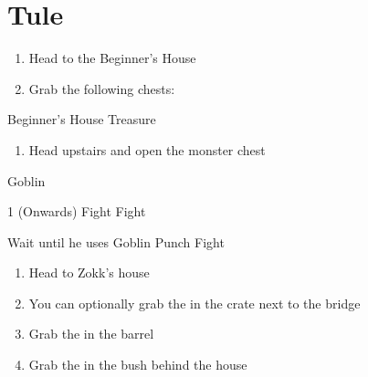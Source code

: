 \chapter{Tule}

\vspace{\baselineskip}

\begin{paracol}{2}

\begin{enumerate}
    \item Head to the Beginner's House
    \item Grab the following chests:  
\end{enumerate}

\switchcolumn
\begin{misc}{Beginner's House Treasure}
\end{misc}

\switchcolumn
\resume
\begin{enumerate}[resume]
    \item Head upstairs and open the monster chest
\end{enumerate}

\begin{encounter}{Goblin}
    \varwb
    \begin{round}{1 (Onwards)}
        \bartz Fight \pointRight \space {}
        \lenna Fight \pointRight \space {}
        \item {}
        \vspace{1mm}
        \item[] 
        \item Wait until he uses Goblin Punch
        \galuf Fight
    \end{round}
    \varwe
\end{encounter}

\begin{enumerate}[resume]
    \item Head to Zokk's house
    \item You can optionally grab the  in the crate next to the bridge
    \item Grab the  in the barrel
    \item Grab the  in the bush behind the house
\end{enumerate}


\end{paracol}
